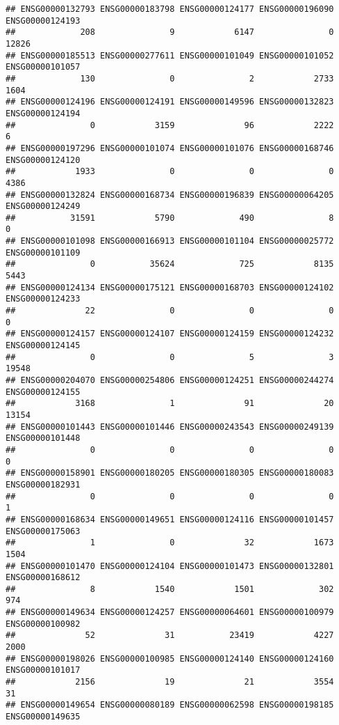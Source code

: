 \documentclass[
]{article}
\begin{document}
\begin{verbatim}
## ENSG00000132793 ENSG00000183798 ENSG00000124177 ENSG00000196090 ENSG00000124193 
##             208               9            6147               0           12826 
## ENSG00000185513 ENSG00000277611 ENSG00000101049 ENSG00000101052 ENSG00000101057 
##             130               0               2            2733            1604 
## ENSG00000124196 ENSG00000124191 ENSG00000149596 ENSG00000132823 ENSG00000124194 
##               0            3159              96            2222               6 
## ENSG00000197296 ENSG00000101074 ENSG00000101076 ENSG00000168746 ENSG00000124120 
##            1933               0               0               0            4386 
## ENSG00000132824 ENSG00000168734 ENSG00000196839 ENSG00000064205 ENSG00000124249 
##           31591            5790             490               8               0 
## ENSG00000101098 ENSG00000166913 ENSG00000101104 ENSG00000025772 ENSG00000101109 
##               0           35624             725            8135            5443 
## ENSG00000124134 ENSG00000175121 ENSG00000168703 ENSG00000124102 ENSG00000124233 
##              22               0               0               0               0 
## ENSG00000124157 ENSG00000124107 ENSG00000124159 ENSG00000124232 ENSG00000124145 
##               0               0               5               3           19548 
## ENSG00000204070 ENSG00000254806 ENSG00000124251 ENSG00000244274 ENSG00000124155 
##            3168               1              91              20           13154 
## ENSG00000101443 ENSG00000101446 ENSG00000243543 ENSG00000249139 ENSG00000101448 
##               0               0               0               0               0 
## ENSG00000158901 ENSG00000180205 ENSG00000180305 ENSG00000180083 ENSG00000182931 
##               0               0               0               0               1 
## ENSG00000168634 ENSG00000149651 ENSG00000124116 ENSG00000101457 ENSG00000175063 
##               1               0              32            1673            1504 
## ENSG00000101470 ENSG00000124104 ENSG00000101473 ENSG00000132801 ENSG00000168612 
##               8            1540            1501             302             974 
## ENSG00000149634 ENSG00000124257 ENSG00000064601 ENSG00000100979 ENSG00000100982 
##              52              31           23419            4227            2000 
## ENSG00000198026 ENSG00000100985 ENSG00000124140 ENSG00000124160 ENSG00000101017 
##            2156              19              21            3554              31 
## ENSG00000149654 ENSG00000080189 ENSG00000062598 ENSG00000198185 ENSG00000149635 

\end{verbatim}
\end{document}
